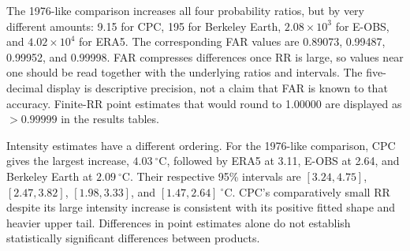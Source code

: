 \documentclass[11pt]{article}
\begin{document}
The 1976-like comparison increases all four probability ratios, but by
very different amounts: 9.15 for CPC, 195 for Berkeley Earth,
$2.08\times10^3$ for E-OBS, and $4.02\times10^4$ for ERA5. The
corresponding FAR values are 0.89073, 0.99487, 0.99952, and 0.99998.
FAR compresses differences once RR is large, so values near one should
be read together with the underlying ratios and intervals. The
five-decimal display is descriptive precision, not a claim that FAR is
known to that accuracy. Finite-RR point estimates that would round to
1.00000 are displayed as $>0.99999$ in the results tables.

Intensity estimates have a different ordering. For the 1976-like
comparison, CPC gives the largest increase,
$4.03\ ^{\circ}\mathrm{C}$, followed by ERA5 at 3.11, E-OBS at 2.64,
and Berkeley Earth at $2.09\ ^{\circ}\mathrm{C}$. Their respective
95\% intervals are $[3.24,4.75]$, $[2.47,3.82]$, $[1.98,3.33]$, and
$[1.47,2.64]\ ^{\circ}\mathrm{C}$. CPC's comparatively small RR despite
its large intensity increase is consistent with its positive fitted
shape and heavier upper tail. Differences in point estimates alone do
not establish statistically significant differences between products.
\end{document}
